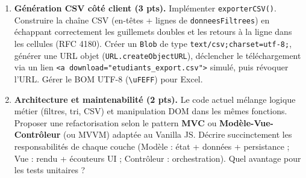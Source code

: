 \documentclass[11pt]{article}
\begin{document}
\begin{exercice}
\begin{enumerate}
    \item \textbf{Génération CSV côté client (3 pts).} Implémenter \texttt{exporterCSV()}. Construire la chaîne CSV (en-têtes + lignes de \texttt{donneesFiltrees}) en échappant correctement les guillemets doubles et les retours à la ligne dans les cellules (RFC 4180). Créer un \texttt{Blob} de type \texttt{text/csv;charset=utf-8;}, générer une URL objet (\texttt{URL.createObjectURL}), déclencher le téléchargement via un lien \texttt{<a download="etudiants\_export.csv">} simulé, puis révoquer l'URL. Gérer le BOM UTF-8 (\texttt{\textbackslash uFEFF}) pour Excel.
    \item \textbf{Architecture et maintenabilité (2 pts).} Le code actuel mélange logique métier (filtres, tri, CSV) et manipulation DOM dans les mêmes fonctions. Proposer une refactorisation selon le pattern \textbf{MVC} ou \textbf{Modèle-Vue-Contrôleur} (ou MVVM) adaptée au Vanilla JS. Décrire succinctement les responsabilités de chaque couche (Modèle : état + données + persistance ; Vue : rendu + écouteurs UI ; Contrôleur : orchestration). Quel avantage pour les tests unitaires ?
\end{enumerate}
\end{exercice}
\end{document}
